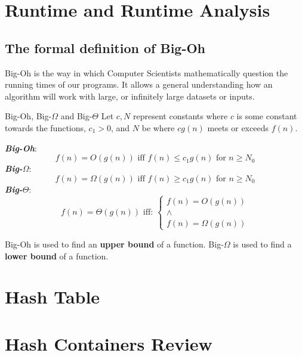 \section{Runtime and Runtime Analysis}
\subsection{The formal definition of Big-Oh}

Big-Oh is the way in which Computer Scientists mathematically question the running times of our programs. It allows a general understanding how an algorithm will work with large, or infinitely large datasets or inputs.
\begin{definition}{Big-Oh, Big-$\Omega$ and Big-$\Theta$}{}
    Let $c, N$ represent constants where $c$ is some constant towards the functions, $c_1 > 0$, and $N$ be where $cg(n)$ meets or exceeds $f(n)$.
    \par
    \textbf{\emph{Big-Oh}}:
    \begin{equation*}
        f(n) = O(g(n)) \text{ iff } f(n) \le c_1g(n) \text{ for } n \ge N_0
    \end{equation*}
    \textbf{\emph{Big-$\Omega$}}:
    \begin{equation*}
        f(n) = \Omega(g(n)) \text{ iff } f(n) \ge c_1g(n) \text{ for } n \ge N_0
    \end{equation*}
    \textbf{\emph{Big-$\Theta$}}:
    \begin{equation*}
        f(n) = \Theta(g(n)) \text{ iff: }   \begin{cases}
                                                f(n) = O(g(n)) \\
                                                \wedge \\
                                                f(n) = \Omega(g(n))
                                            \end{cases}
    \end{equation*}
\end{definition}

Big-Oh is used to find an \textbf{upper bound} of a function. Big-$\Omega$ is used to find a \textbf{lower bound} of a function.

\section{Hash Table}

\section{Hash Containers Review}
